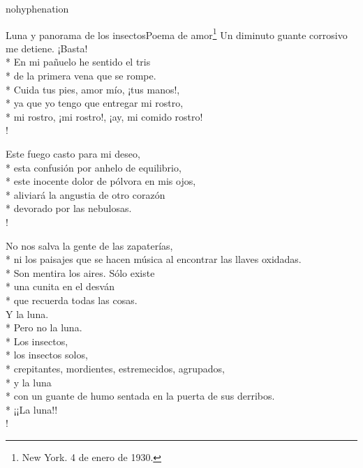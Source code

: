 \documentclass[
    a5paper,
    DIV=10,
    12pt,
    notitlepage,
    oneside,]
{scrbook} %
\begin{document}
\begin{hyphenrules}{nohyphenation}
\begin{poem}{Luna y panorama de los insectos}{Poema de amor\footnote{New York. 4 de enero de 1930.}}{}
Un diminuto guante corrosivo me detiene. ¡Basta!\\*
En mi pañuelo he sentido el tris\\*
de la primera vena que se rompe.\\*
Cuida tus pies, amor mío, ¡tus manos!,\\*
ya que yo tengo que entregar mi rostro,\\*
mi rostro, ¡mi rostro!, ¡ay, mi comido rostro! \\!

Este fuego casto para mi deseo,\\*
esta confusión por anhelo de equilibrio,\\*
este inocente dolor de pólvora en mis ojos,\\*
aliviará la angustia de otro corazón\\*
devorado por las nebulosas.\\!

No nos salva la gente de las zapaterías,\\*
ni los paisajes que se hacen música al encontrar las llaves oxidadas.\\*
Son mentira los aires. Sólo existe\\*
una cunita en el desván\\*
que recuerda todas las cosas.\\

Y la luna.\\*
Pero no la luna.\\*
Los insectos,\\*
los insectos solos,\\*
crepitantes, mordientes, estremecidos, agrupados,\\*
y la luna\\*
con un guante de humo sentada en la puerta de sus derribos.\\*
¡¡La luna!! \\!

\end{poem}


\end{hyphenrules}
\end{document}
